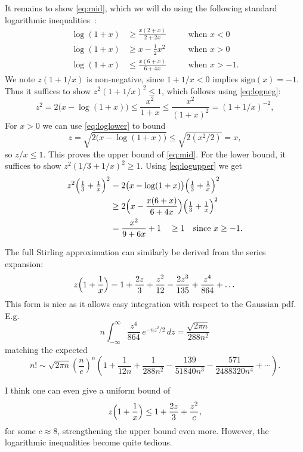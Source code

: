 \documentclass[11pt]{article}
\begin{document}
It remains to show \eqref{eq:mid},
which we will do using the following standard logarithmic inequalities~\cite{wiki-logs}:
\begin{align}
    \log(1+x) &\ge \frac{x(2+x)}{2+2x} \quad &&\text{when } x<0
    \label{eq:logneg}
    \\
    \log(1+x) &\ge x-\tfrac{1}{2}x^2 \quad &&\text{when } x>0
    \label{eq:loglower}
    \\
    \log(1+x) &\le \frac{x(6+x)}{6+4x}
     \quad &&\text{when } x>-1.
    \label{eq:logupper}
\end{align}
We note $z(1+1/x)$ is non-negative, since $1+1/x<0$ implies $\mathrm{sign}(x)=-1$.
Thus it suffices to show $z^2(1+1/x)^2\le 1$, which follows using \eqref{eq:logneg}:
\[
z^2 = 2\bigl(x-\log(1+x)\bigr)
\le \frac{x^2}{1+x}
\le \frac{x^2}{(1+x)^2}
= (1+1/x)^{-2},
\]
For $x>0$ we can use \eqref{eq:loglower} to bound
\[
z = \sqrt{2\bigl(x-\log(1+x)\bigr)}
\le \sqrt{2(x^2/2)} = x,
\]
so $z/x\le 1$.
This proves the upper bound of \eqref{eq:mid}.
For the lower bound, it suffices to show
$z^2(1/3+1/x)^2 \ge 1.$
Using \eqref{eq:logupper} we get
\begin{align*}
z^2\Bigl(\tfrac{1}{3}+\tfrac{1}{x}\Bigr)^2
&= 2\bigl(x - \log(1+x)\bigr)\Bigl(\tfrac{1}{3}+\tfrac{1}{x}\Bigr)^2 \\
&\ge 2\Bigl(x - \frac{x(6+x)}{6+4x}\Bigr)\Bigl(\tfrac{1}{3}+\tfrac{1}{x}\Bigr)^2 \\
&= \frac{x^2}{9 + 6 x} + 1
\quad\ge 1 \quad \text{since } x\ge -1.
\end{align*}

\medskip

The full Stirling approximation can similarly be derived from the series expansion:
\[
z\Bigl(1+\frac{1}{x}\Bigr) = 1 + \frac{2z}{3} + \frac{z^2}{12}
- \frac{2z^3}{135} + \frac{z^4}{864} + \dots
\]
This form is nice as it allows easy integration with respect to the Gaussian pdf.
E.g.
\[
n\int_{-\infty}^{\infty}\frac{z^4}{864} \, e^{-n z^2/2} \, dz = \frac{\sqrt{2 \pi n}}{288n^{2}}
\]
matching the expected
\[
n! \sim \sqrt{2\pi n}\left(\frac{n}{e}\right)^n \left(1 +\frac{1}{12n}+\frac{1}{288n^2} - \frac{139}{51840n^3} -\frac{571}{2488320n^4}+ \cdots \right).
\]

I think one can even give a uniform bound of
\[
z\Bigl(1+\frac{1}{x}\Bigr) \le 1 + \frac{2z}{3} + \frac{z^2}{c},
\]
for some $c\approx 8$, strengthening the upper bound even more.
However, the logarithmic inequalities become quite tedious.

\medskip
\end{document}
